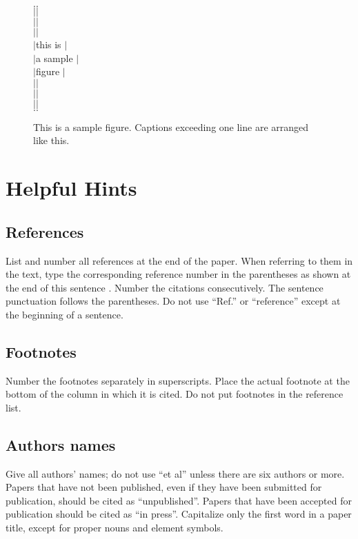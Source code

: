\documentclass[twocolumn]{article}
\begin{document}
\begin{figure}[tb]
\begin{center}
\begin{minipage}{5cm}
$.$\hrulefill $.$\\$|$\hfill $|$\\$|$\hfill $|$\\$|$\hfill $|$\\
$|$\hfill this is \hfill $|$\\
$|$\hfill a sample \hfill $|$\\
$|$\hfill  figure  \hfill $|$\\
$|$\hfill $|$\\$|$\hfill $|$\\$|$\hfill $|$\\$.$\hrulefill $.$\\
\end{minipage}
\caption{This is a sample figure. Captions exceeding
one line are arranged like this.}
\end{center}
\end{figure}

\section{Helpful Hints}

\subsection{References}
List and number all references at the end of the paper. When referring
to them in the text, type the corresponding reference number in the
parentheses as shown at the end of this sentence \cite{key}. Number
the citations consecutively. The sentence punctuation follows the
parentheses. Do not use ``Ref.\cite{baz}'' or
``reference\cite{baz}'' except at the beginning of a sentence.

\subsection{Footnotes}
Number the footnotes separately in superscripts. Place the actual
footnote at the bottom of the column in which it is cited. Do not put
footnotes in the reference list.

\subsection{Authors names}

Give all authors' names; do not use ``et al'' unless there are six
authors or more. Papers that have not been published, even if they have
been submitted for publication, should be cited as
``unpublished''\cite{unpub}.  Papers that have been accepted for
publication should be cited as ``in press''\cite{inpress}.
Capitalize only the first word in a paper title, except for proper nouns
and element symbols.
\end{document}
